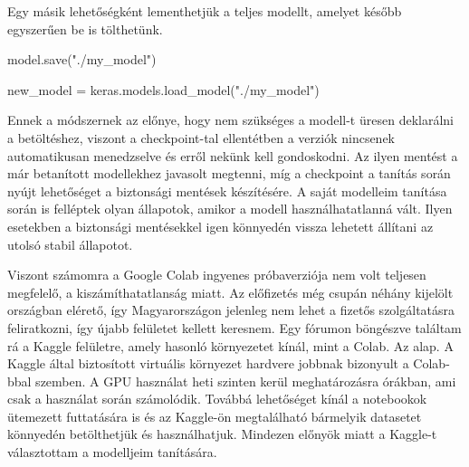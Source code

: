 Egy másik lehetőségként lementhetjük a teljes modellt, amelyet később egyszerűen be is tölthetünk.
\begin{python}
model.save("./my_model")

new_model = keras.models.load_model("./my_model")
\end{python}
Ennek a módszernek az előnye, hogy nem szükséges a modell-t üresen deklarálni a betöltéshez, viszont a checkpoint-tal ellentétben a verziók nincsenek automatikusan menedzselve és erről nekünk kell gondoskodni. Az ilyen mentést a már betanított modellekhez javasolt megtenni, míg a checkpoint a tanítás során nyújt lehetőséget a biztonsági mentések készítésére. A saját modelleim tanítása során is felléptek olyan állapotok, amikor a modell használhatatlanná vált. Ilyen esetekben a biztonsági mentésekkel igen könnyedén vissza lehetett állítani az utolsó stabil állapotot.

Viszont számomra a Google Colab ingyenes próbaverziója nem volt teljesen megfelelő, a kiszámíthatatlanság miatt. Az előfizetés még csupán néhány kijelölt országban elérető, így Magyarországon jelenleg nem lehet a fizetős szolgáltatásra feliratkozni, így újabb felületet kellett keresnem.
Egy fórumon böngészve találtam rá a Kaggle \cite{kaggle} felületre, amely hasonló környezetet kínál, mint a Colab. Az alap. A Kaggle által biztosított virtuális környezet hardvere jobbnak bizonyult a Colab-bbal szemben. A GPU használat heti szinten kerül meghatározásra órákban, ami csak a használat során számolódik. Továbbá lehetőséget kínál a notebookok ütemezett futtatására is és az Kaggle-ön megtalálható bármelyik datasetet könnyedén betölthetjük és használhatjuk. Mindezen előnyök miatt a Kaggle-t választottam a modelljeim tanítására.

